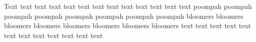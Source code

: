\documentclass{article}
\begin{document}
\leftskip=1pt
  
Text text text text text text text text text text text text text
poompah poompah poompah poompah poompah poompah poompah poompah 
bloomers bloomers bloomers bloomers bloomers bloomers bloomers bloomers 
 text text text text text text text text text text text text
\end{document}
